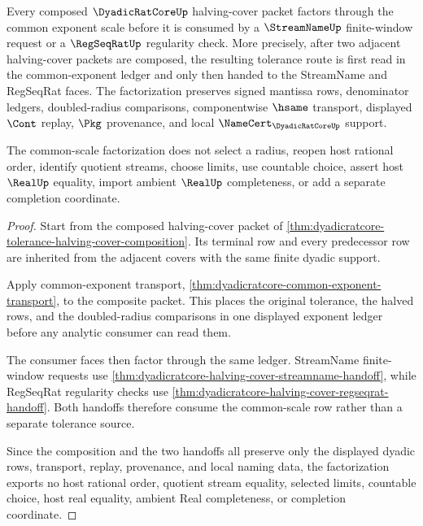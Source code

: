 \begin{theorem}
\label{thm:dyadicratcore-common-scale-halving-cover-factorization}
Every composed $\DyadicRatCoreUp$ halving-cover packet factors through the common exponent scale before it is consumed by a $\StreamNameUp$ finite-window request or a $\RegSeqRatUp$ regularity check. More precisely, after two adjacent halving-cover packets are composed, the resulting tolerance route is first read in the common-exponent ledger and only then handed to the StreamName and RegSeqRat faces. The factorization preserves signed mantissa rows, denominator ledgers, doubled-radius comparisons, componentwise $\hsame$ transport, displayed $\Cont$ replay, $\Pkg$ provenance, and local $\NameCert_{\DyadicRatCoreUp}$ support.

The common-scale factorization does not select a radius, reopen host rational order, identify quotient streams, choose limits, use countable choice, assert host $\RealUp$ equality, import ambient $\RealUp$ completeness, or add a separate completion coordinate.
\end{theorem}
\begin{proof}
Start from the composed halving-cover packet of \autoref{thm:dyadicratcore-tolerance-halving-cover-composition}. Its terminal row and every predecessor row are inherited from the adjacent covers with the same finite dyadic support.

Apply common-exponent transport, \autoref{thm:dyadicratcore-common-exponent-transport}, to the composite packet. This places the original tolerance, the halved rows, and the doubled-radius comparisons in one displayed exponent ledger before any analytic consumer can read them.

The consumer faces then factor through the same ledger. StreamName finite-window requests use \autoref{thm:dyadicratcore-halving-cover-streamname-handoff}, while RegSeqRat regularity checks use \autoref{thm:dyadicratcore-halving-cover-regseqrat-handoff}. Both handoffs therefore consume the common-scale row rather than a separate tolerance source.

Since the composition and the two handoffs all preserve only the displayed dyadic rows, transport, replay, provenance, and local naming data, the factorization exports no host rational order, quotient stream equality, selected limits, countable choice, host real equality, ambient Real completeness, or completion coordinate.
\end{proof}
